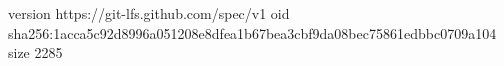 version https://git-lfs.github.com/spec/v1
oid sha256:1acca5c92d8996a051208e8dfea1b67bea3cbf9da08bec75861edbbc0709a104
size 2285
